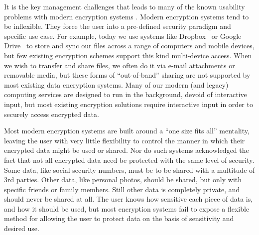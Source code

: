 It is the key management challenges that leads to many of the known
usability problems with modern encryption systems \cite{Whitten1999,
  Sweikata2009, Kher2005}. Modern encryption systems tend to be
inflexible. They force the user into a pre-defined security paradigm
and specific use case. For example, today we use systems like
Dropbox~\cite{dropbox} or Google Drive~\cite{google-drive} to store
and sync our files across a range of computers and mobile devices, but
few existing encryption schemes support this kind multi-device
access. When we wish to transfer and share files, we often do it via
e-mail attachments or removable media, but these forms of
``out-of-band'' sharing are not supported by most existing data
encryption systems. Many of our modern (and legacy) computing services
are designed to run in the background, devoid of interactive input,
but most existing encryption solutions require interactive input in
order to securely access encrypted data.

Most modern encryption systems are built around a ``one size fits
all'' mentality, leaving the user with very little flexibility to
control the manner in which their encrypted data might be used or
shared. Nor do such systems acknowledged the fact that not all
encrypted data need be protected with the same level of security. Some
data, like social security numbers, must be to be shared with a
multitude of 3rd parties. Other data, like personal photos, should be
shared, but only with specific friends or family members. Still other
data is completely private, and should never be shared at all. The
user knows how sensitive each piece of data is, and how it should be
used, but most encryption systems fail to expose a flexible method for
allowing the user to protect data on the basis of sensitivity and
desired use.

